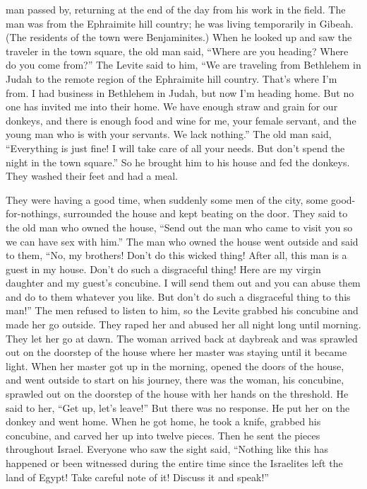 {man
passed by, returning
at the end of the day from
his work
in the field.
The man
was from the Ephraimite
hill country;
he
was living temporarily
in Gibeah.
(The residents
of the town
were Benjaminites.)
When he looked up
and saw
the traveler
in the town
square,
the old
man
said,
“Where
are you heading? Where
do you come from?”
The Levite said
to
him, “We
are traveling
from Bethlehem
in Judah
to the remote region
of the Ephraimite
hill country.
That’s where I’m
from. I had business in Bethlehem
in Judah,
but now I’m
heading
home.
But no
one
has invited
me into their home.
We have
enough
straw
and grain
for our donkeys,
and there is
enough
food
and wine
for me, your female servant,
and the young man
who is with
your servants.
We lack
nothing.”
The old
man
said,
“Everything
is just
fine! I will take care
of all
your needs.
But
don’t
spend
the night in the town square.”
So he brought
him to his house
and fed
the donkeys.
They washed
their feet
and had a meal.
\par }{\PP {}They
were having a good
time, when suddenly
some men
of the city,
some good-for-nothings,
surrounded
the
house
and kept beating
on
the door.
They said
to
the old
man
who owned
the house,
“Send out
the
man
who
came
to visit
you so we can have sex
with him.”
The man
who owned
the house
went
outside and said
to
them, “No,
my brothers! Don’t
do this wicked
thing! After
all, this
man
is a guest in my house.
Don’t
do
such a disgraceful thing!
Here
are my virgin
daughter
and my guest’s concubine.
I will send
them out
and you can abuse
them and do
to them whatever you like.
But don’t
do
such a disgraceful
thing
to this
man!”
The men
refused
to listen
to him, so the Levite
grabbed
his concubine
and made her go
outside.
They raped
her and abused
her all
night
long until
morning.
They let
her go
at dawn.
The woman
arrived
back at daybreak
and was sprawled
out on
the doorstep
of the house
where
her master
was staying
until
it became light.
When her master
got
up in the morning,
opened
the doors
of the house,
and went
outside to start on
his journey,
there
was the woman,
his concubine,
sprawled
out on
the doorstep
of the house
with her hands
on
the threshold.
He said
to her,
“Get
up, let’s
leave!” But there was no
response.
He put her
on
the donkey
and
went
home.
When he got
home,
he took
a knife,
grabbed
his concubine,
and carved
her up
into twelve
pieces.
Then he sent
the pieces throughout
Israel.
Everyone
who saw
the sight said,
“Nothing
like this has happened or
been witnessed
during
the entire
time
since
the Israelites
left the land
of Egypt! Take careful note of it! Discuss
it and speak!”

}
